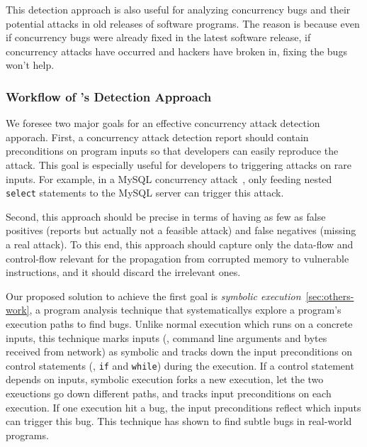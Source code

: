 This detection approach is also useful for analyzing concurrency bugs and their 
potential attacks in old releases of software programs. The reason is because 
even if concurrency bugs were already fixed in the latest software release, if 
concurrency attacks have occurred and hackers have broken in, fixing the bugs 
won't help.


\vspace{-.15in}\subsubsection{Workflow of \xxx's Detection Approach}
\label{sec:detect-arch}\vspace{-.075in}

We foresee two major goals for an effective concurrency attack detection 
apporach. First, a concurrency attack detection report should contain 
preconditions on program inputs so that developers can easily reproduce the 
attack. This goal is especially useful for developers to triggering attacks on 
rare inputs. For example, in a MySQL concurrency attack~\cite{XXX}, only feeding
nested \texttt{select} statements to the MySQL server can trigger this attack.

Second, this approach should be precise in terms of having as few as false 
positives (reports but actually not a feasible attack) and false negatives 
(missing a real attack). To this end, this approach should capture only the 
data-flow and control-flow relevant for the propagation from corrupted memory 
to vulnerable instructions, and it should discard the irrelevant ones. 

Our proposed solution to achieve the first goal is \emph{symbolic 
execution}~\ref{sec:others-work}, a program analysis technique that 
systematicallys explore a program's execution paths to find bugs. Unlike normal 
execution which runs on a concrete inputs, this technique marks inputs (\eg, 
command line arguments and bytes received from network) as symbolic and tracks 
down the input preconditions on control statements (\eg, \texttt{if} and 
\texttt{while}) during the execution. If a control statement depends on inputs, 
symbolic execution forks a new execution, let the two exeuctions go down 
different paths, and tracks input preconditions on each execution. If one 
execution hit a bug, the input preconditions reflect which inputs can trigger 
this bug. This technique has shown to find subtle bugs in real-world programs.

